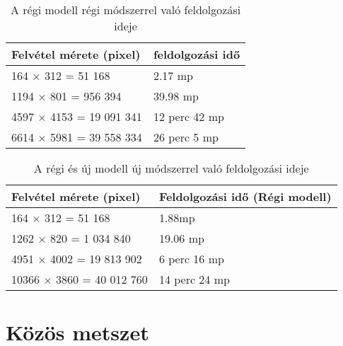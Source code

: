 \begin{table}[H]
	\centering
	\begin{tabular}{ | p{} | p{} | }
		\hline
		\textbf{Felvétel mérete (pixel)} & \textbf{feldolgozási idő} \\
		\hline \hline
		164 × 312 = 51 168  & 2.17 mp  \\
		\hline
		1194 × 801 = 956 394 & 39.98 mp\\
		\hline
		4597 × 4153 = 19 091 341 & 12 perc 42 mp \\
		\hline
        6614 × 5981 = 39 558 334 & 26 perc 5 mp  \\
		\hline
	\end{tabular}
	\caption{A régi modell régi módszerrel való feldolgozási ideje}
	\label{tab:old-speed}
\end{table}

\begin{table}[H]
	\centering
	\begin{tabular}{ | p{} | p{} | }
		\hline
		\textbf{Felvétel mérete (pixel)} & \textbf{Feldolgozási idő (Régi modell)} \\
		\hline \hline
		164 × 312 = 51 168  & 1.88mp  \\
		\hline
		1262 × 820 = 1 034 840 & 19.06 mp\\
		\hline
		4951 × 4002 = 19 813 902 & 6 perc 16 mp \\
		\hline
        10366 × 3860 = 40 012 760 & 14 perc 24 mp  \\
		\hline
	\end{tabular}
	\caption{A régi és új modell új módszerrel való feldolgozási ideje}
	\label{tab:new-speed}
\end{table}

\section{Közös metszet}
\label{ch:intersection}

